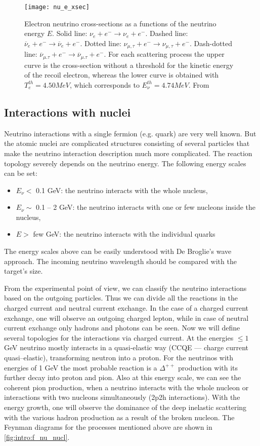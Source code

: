 \documentclass[../main.tex]{subfiles}
\begin{document}
\begin{figure}[!ht]
  \centering
  \texttt{[image: nu\_e\_xsec]}
  \caption{Electron neutrino cross-sections as a functions of the neutrino energy $E$. Solid line: $\nu_e+e^-\to\nu_e+e^-$. Dashed line: $\overline{\nu}_e+e^-\to\overline{\nu}_e+e^-$. Dotted line: $\nu_{\mu, \tau}+e^-\to\nu_{\mu, \tau}+e^-$. Dash-dotted line: $\overline{\nu}_{\mu. \tau}+e^-\to\overline{\nu}_{\mu. \tau}+e^-$. For each scattering process the upper curve is the cross-section without a threshold for the kinetic energy of the recoil electron, whereas the lower curve is obtained with $T_e^{th}=4.50 MeV$, which corresponds to $E_\nu^{th} = 4.74 MeV$. From~\cite{Auerbach2001}}
  \label{fig:intro:nue_xsec}
\end{figure}


\subsection{Interactions with nuclei}
\label{sec:intro:nuclei}
Neutrino interactions with a single fermion (e.g. quark) are very well known. But the atomic nuclei are complicated structures consisting of several particles that make the neutrino interaction description much more complicated. The reaction topology severely depends on the neutrino energy. The following energy scales can be set:
\begin{itemize}
  \item $E_\nu <$ 0.1 GeV: the neutrino interacts with the whole nucleus,
  \item $E_\nu\sim$ 0.1 -- 2 GeV: the neutrino interacts with one or few nucleons inside the nucleus,
  \item $E>$ few GeV: the neutrino interacts with the individual quarks
\end{itemize}

The energy scales above can be easily understood with De Broglie's wave approach. The incoming neutrino wavelength should be compared with the target's size.

From the experimental point of view, we can classify the neutrino interactions based on the outgoing particles. Thus we can divide all the reactions in the charged current and neutral current exchange. In the case of a charged current exchange, one will observe an outgoing charged lepton, while in case of neutral current exchange only hadrons and photons can be seen. Now we will define several topologies for the interactions via charged current. At the energies $\le1$ GeV neutrino mostly interacts in a quasi-elastic way (CCQE --- charge current quasi--elastic), transforming neutron into a proton. For the neutrinos with energies of 1 GeV the most probable reaction is a $\Delta^{++}$ production with its further decay into proton and pion. Also at this energy scale, we can see the coherent pion production, when a neutrino interacts with the whole nucleon or interactions with two nucleons simultaneously (2p2h interactions). With the energy growth, one will observe the dominance of the deep inelastic scattering with the various hadron production as a result of the broken nucleon. The Feynman diagrams for the processes mentioned above are shown in \autoref{fig:intro:f_nu_nucl}.
\end{document}
